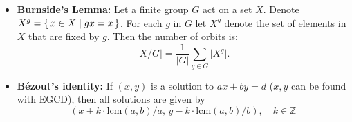 \documentclass[9pt,a4paper,landscape,oneside]{amsart}
\newenvironment{myitemize}
{\begin{itemize}[leftmargin=.3cm]
	\setlength{\itemsep}{0pt}
	\setlength{\parskip}{0pt}
	\setlength{\parsep}{0pt}     }
{ \end{itemize}                  }
\begin{document}
\begin{multicols*}{3}
\begin{myitemize}
	\item \textbf{Burnside's Lemma:}
		Let a finite group $G$ act on a set $X$.
		Denote $X^g = \set{ x \in X | gx = x}$.
		For each $g$ in $G$ let $X^g$ denote the set of elements in $X$ that are fixed by $g$.
		Then the number of orbits is:
		\begin{equation*}
			\lvert X/G \rvert = \frac{1}{\lvert G \rvert} \sum_{g\in G} \lvert X^g \rvert.
		\end{equation*}

\item \textbf{Bézout's identity:}
If $(x,y)$ is a solution to $ax+by=d$ ($x, y$ can be found with EGCD),
then all solutions are given by
\[
	\left( x + k \cdot \mathrm{lcm}(a,b) / a, \, y - k \cdot \mathrm{lcm}(a,b) / b \right), \quad k \in \mathbb{Z}
\]
\end{myitemize}


\end{multicols*}
\end{document}
